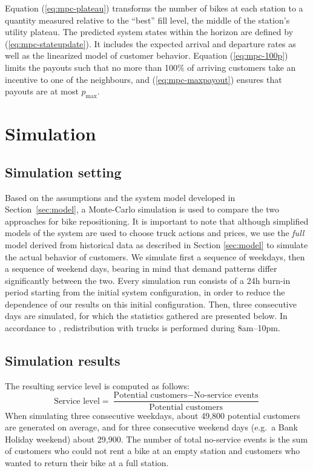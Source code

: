 \documentclass{article}
\begin{document}
Equation (\ref{eq:mpc-plateau}) transforms the number of bikes at each station
to a quantity measured relative to the ``best'' fill level, the middle of the
station's utility plateau. The predicted system states within the horizon are
defined by (\ref{eq:mpc-stateupdate}). It includes the expected arrival and
departure rates as well as the linearized model of customer behavior. Equation
(\ref{eq:mpc-100p}) limits the payouts such that no more than 100\% of arriving
customers take an incentive to one of the neighbours, and
(\ref{eq:mpc-maxpayout}) ensures that payouts are at most $p_\text{max}$.

\section{Simulation}
\label{sec:simulation}

\subsection{Simulation setting}
Based on the assumptions and the system model developed in
Section~\ref{sec:model}, a Monte-Carlo simulation is used to compare the two
approaches for bike repositioning. It is important to note that although
simplified models of the system are used to choose truck actions and prices, we
use the \emph{full} model derived from historical data as described in Section
\ref{sec:model} to simulate the actual behavior of customers. We simulate first
a sequence of weekdays, then a sequence of weekend days, bearing in mind that
demand patterns differ significantly between the two. Every simulation run
consists of a 24h burn-in period starting from the initial system configuration,
in order to reduce the dependence of our results on this initial configuration.
Then, three consecutive days are simulated, for which the statistics gathered
are presented below. In accordance to \cite{redistribution_2012}, redistribution
with trucks is performed during 8am--10pm.


\subsection{Simulation results}

The resulting service level is computed as follows:
\begin{equation}
\text{Service level} = \frac{\text{Potential customers} - \text{No-service events}}{\text{Potential customers}}
\end{equation}
When simulating three consecutive weekdays, about 49,800 potential customers are
generated on average, and for three consecutive weekend days (e.g.~a Bank
Holiday weekend) about 29,900. The number of total no-service events is the sum
of customers who could not rent a bike at an empty station and customers who
wanted to return their bike at a full station.
\end{document}

